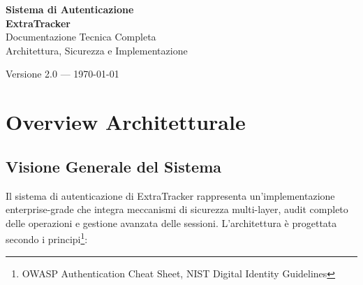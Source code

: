 \documentclass[12pt,a4paper]{report}
\begin{document}
\begin{titlepage}
    \centering
    \vspace*{2cm}
    {\Huge\bfseries Sistema di Autenticazione\\[0.5cm] ExtraTracker}\\[2cm]
    {\LARGE Documentazione Tecnica Completa}\\[1cm]
    {\large Architettura, Sicurezza e Implementazione}\\[3cm]
    
    
    \vfill
    {\large Versione 2.0 --- \today}
\end{titlepage}

\tableofcontents
\newpage

\chapter{Overview Architetturale}

\section{Visione Generale del Sistema}

Il sistema di autenticazione di ExtraTracker rappresenta un'implementazione enterprise-grade che integra meccanismi di sicurezza multi-layer, audit completo delle operazioni e gestione avanzata delle sessioni. L'architettura è progettata secondo i principi\footnote{OWASP Authentication Cheat Sheet, NIST Digital Identity Guidelines}:
\end{document}
